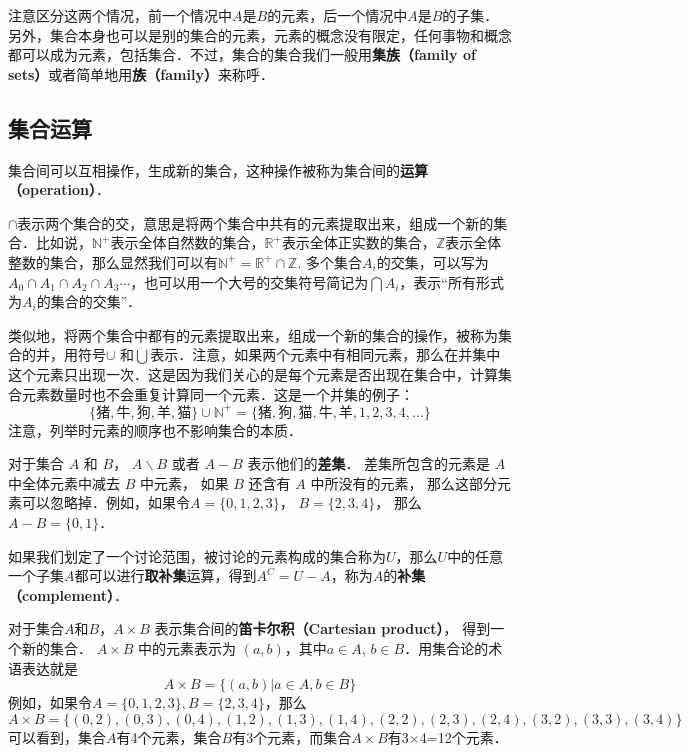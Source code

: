 注意区分这两个情况，前一个情况中$A$是$B$的元素，后一个情况中$A$是$B$的子集．另外，集合本身也可以是别的集合的元素，元素的概念没有限定，任何事物和概念都可以成为元素，包括集合．不过，集合的集合我们一般用\textbf{集族（family of sets）}或者简单地用\textbf{族（family）}来称呼．



\subsection{集合运算}

集合间可以互相操作，生成新的集合，这种操作被称为集合间的\textbf{运算（operation）}．

$\cap$表示两个集合的交，意思是将两个集合中共有的元素提取出来，组成一个新的集合．比如说，$\mathbb{N^+}$表示全体自然数的集合，$\mathbb{R^+}$表示全体正实数的集合，$\mathbb{Z}$表示全体整数的集合，那么显然我们可以有$\mathbb{N^+}=\mathbb{R^+}\cap\mathbb{Z}$. 多个集合$A_i$的交集，可以写为$A_0\cap A_1\cap A_2\cap A_3⋯$，也可以用一个大号的交集符号简记为$\bigcap A_i$，表示“所有形式为$A_i$的集合的交集”．

类似地，将两个集合中都有的元素提取出来，组成一个新的集合的操作，被称为集合的并，用符号$\cup$ 和$\bigcup$表示．注意，如果两个元素中有相同元素，那么在并集中这个元素只出现一次．这是因为我们关心的是每个元素是否出现在集合中，计算集合元素数量时也不会重复计算同一个元素．这是一个并集的例子：
\begin{equation}
\{\text{猪}, \text{牛}, \text{狗}, \text{羊}, \text{猫}\}\cup\mathbb{N^+}=\{\text{猪}, \text{狗}, \text{猫}, \text{牛}, \text{羊}, 1, 2,3,4,\dots\}
\end{equation}
注意，列举时元素的顺序也不影响集合的本质．

对于集合 $A$ 和 $B$， $A\backslash B$ 或者 $A-B$ 表示他们的\textbf{差集}． 差集所包含的元素是 $A$ 中全体元素中减去 $B$ 中元素， 如果 $B$ 还含有 $A$ 中所没有的元素， 那么这部分元素可以忽略掉．例如，如果令$A=\{0,1,2,3\}$， $B=\{2,3,4\}$， 那么 $A-B=\{0,1\}$．

如果我们划定了一个讨论范围，被讨论的元素构成的集合称为$U$，那么$U$中的任意一个子集$A$都可以进行\textbf{取补集}运算，得到$A^C=U-A$，称为$A$的\textbf{补集（complement）}．

对于集合$A$和$B$，$A\times B$ 表示集合间的\textbf{笛卡尔积（Cartesian product）}， 得到一个新的集合． $A\times B$ 中的元素表示为 $(a,b)$，其中$a\in A$, $b\in B$．用集合论的术语表达就是
\begin{equation}
A\times B=\{(a,b)|a\in A, b\in B\}
\end{equation}
例如，如果令$A=\{0,1,2,3\}, B=\{2,3,4\}$，那么
\begin{equation}
A\times B=\{ (0,2),(0,3),(0,4),(1,2),(1,3),(1,4),(2,2),(2,3),(2,4),(3,2),(3,3),(3,4) \}
\end{equation}
可以看到，集合$A$有4个元素，集合$B$有3个元素，而集合$A\times B$有3$\times$4=12个元素．

